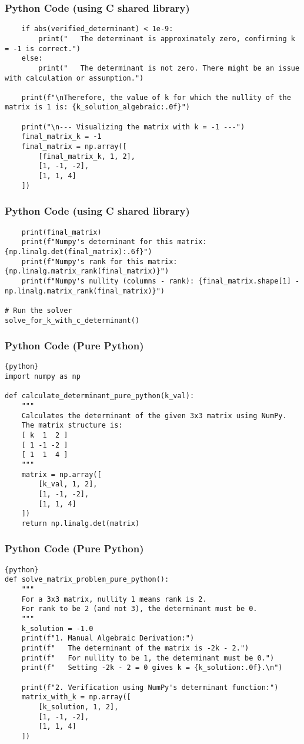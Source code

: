 \documentclass{beamer}
\begin{document}
\begin{frame}[fragile]
\frametitle{Python Code (using C shared library)}
\begin{lstlisting}
    if abs(verified_determinant) < 1e-9:
        print("   The determinant is approximately zero, confirming k = -1 is correct.")
    else:
        print("   The determinant is not zero. There might be an issue with calculation or assumption.")

    print(f"\nTherefore, the value of k for which the nullity of the matrix is 1 is: {k_solution_algebraic:.0f}")

    print("\n--- Visualizing the matrix with k = -1 ---")
    final_matrix_k = -1
    final_matrix = np.array([
        [final_matrix_k, 1, 2],
        [1, -1, -2],
        [1, 1, 4]
    ])
    \end{lstlisting}
\end{frame}

\begin{frame}[fragile]
\frametitle{Python Code (using C shared library)}
\begin{lstlisting}
    print(final_matrix)
    print(f"Numpy's determinant for this matrix: {np.linalg.det(final_matrix):.6f}")
    print(f"Numpy's rank for this matrix: {np.linalg.matrix_rank(final_matrix)}")
    print(f"Numpy's nullity (columns - rank): {final_matrix.shape[1] - np.linalg.matrix_rank(final_matrix)}")

# Run the solver
solve_for_k_with_c_determinant()
\end{lstlisting}
\end{frame}

\begin{frame}[fragile]
\frametitle{Python Code (Pure Python)}
\begin{lstlisting}{python}
import numpy as np

def calculate_determinant_pure_python(k_val):
    """
    Calculates the determinant of the given 3x3 matrix using NumPy.
    The matrix structure is:
    [ k  1  2 ]
    [ 1 -1 -2 ]
    [ 1  1  4 ]
    """
    matrix = np.array([
        [k_val, 1, 2],
        [1, -1, -2],
        [1, 1, 4]
    ])
    return np.linalg.det(matrix)
\end{lstlisting}
\end{frame}

\begin{frame}[fragile]
\frametitle{Python Code (Pure Python)}
\begin{lstlisting}{python}
def solve_matrix_problem_pure_python():
    """
    For a 3x3 matrix, nullity 1 means rank is 2.
    For rank to be 2 (and not 3), the determinant must be 0.
    """
    k_solution = -1.0
    print(f"1. Manual Algebraic Derivation:")
    print(f"   The determinant of the matrix is -2k - 2.")
    print(f"   For nullity to be 1, the determinant must be 0.")
    print(f"   Setting -2k - 2 = 0 gives k = {k_solution:.0f}.\n")

    print(f"2. Verification using NumPy's determinant function:")
    matrix_with_k = np.array([
        [k_solution, 1, 2],
        [1, -1, -2],
        [1, 1, 4]
    ])
\end{lstlisting}
\end{frame}
\end{document}
